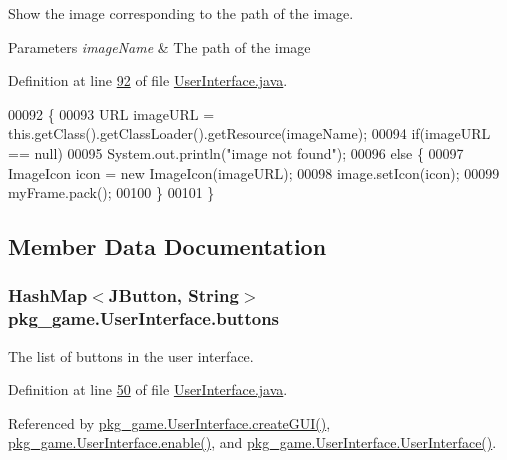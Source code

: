 Show the image corresponding to the path of the image. 


\begin{DoxyParams}{Parameters}
{\em image\-Name} & The path of the image \\
\hline
\end{DoxyParams}


Definition at line \hyperlink{UserInterface_8java_source_l00092}{92} of file \hyperlink{UserInterface_8java_source}{User\-Interface.\-java}.


\begin{DoxyCode}
00092                                             \{
00093         URL imageURL = this.getClass().getClassLoader().getResource(imageName);
00094         \textcolor{keywordflow}{if}(imageURL == null)
00095             System.out.println(\textcolor{stringliteral}{"image not found"});
00096         \textcolor{keywordflow}{else} \{
00097             ImageIcon icon = \textcolor{keyword}{new} ImageIcon(imageURL);
00098             image.setIcon(icon);
00099             myFrame.pack();
00100         \}
00101     \}
\end{DoxyCode}


\subsection{Member Data Documentation}
\hypertarget{classpkg__game_1_1UserInterface_adf0313432ad0c09aae5dcb09cb34a7c2}{
\subsubsection[{buttons}]{\setlength{\rightskip}{0pt plus 5cm}Hash\-Map$<$J\-Button, String$>$ pkg\-\_\-game.\-User\-Interface.\-buttons\hspace{0.3cm}{\ttfamily [private]}}}\label{classpkg__game_1_1UserInterface_adf0313432ad0c09aae5dcb09cb34a7c2}


The list of buttons in the user interface. 



Definition at line \hyperlink{UserInterface_8java_source_l00050}{50} of file \hyperlink{UserInterface_8java_source}{User\-Interface.\-java}.



Referenced by \hyperlink{UserInterface_8java_source_l00123}{pkg\-\_\-game.\-User\-Interface.\-create\-G\-U\-I()}, \hyperlink{UserInterface_8java_source_l00107}{pkg\-\_\-game.\-User\-Interface.\-enable()}, and \hyperlink{UserInterface_8java_source_l00056}{pkg\-\_\-game.\-User\-Interface.\-User\-Interface()}.

